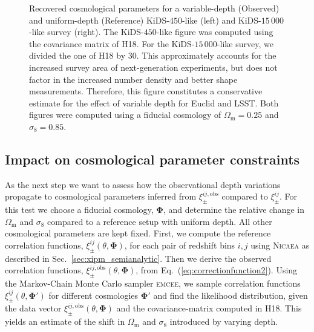 \documentclass{aa}
\renewcommand{\rm}{\mathrm}
\def\b#1{\bm{#1}}
\begin{document}
\begin{figure}
\begin{subfigure}{0.45\textwidth}
\end{subfigure}
\caption{Recovered cosmological parameters for a variable-depth (Observed) and uniform-depth (Reference) KiDS-$450$-like (left) and KiDS-$15\,000$-like survey (right). The KiDS-$450$-like figure was computed using the covariance matrix of H18. For the KiDS-$15\,000$-like survey, we divided the one of H18 by 30. This approximately accounts for the increased survey area of next-generation experiments, but does not factor in the increased number density and better shape measurements. Therefore, this figure constitutes a conservative estimate for the effect of variable depth for Euclid and LSST. Both figures were computed using a fiducial cosmology of $\Omega_{\rm{m}}=0.25$ and $\sigma_8 = 0.85$.}
\label{fig:mcmc_results}
\end{figure} 

\subsection{Impact on cosmological parameter constraints}

As the next step we want to assess how the observational depth variations propagate to cosmological parameters inferred from $\xi_\pm^{ij,\rm{obs}}$ compared to $\xi_\pm^{ij}$. For this test we choose a fiducial cosmology, $\b \Phi$, and determine the relative change in $\Omega_{\rm m}$ and $\sigma_8$ compared to a reference setup with uniform depth. All other cosmological parameters are kept fixed. First, we compute the reference correlation functions, $\xi_\pm^{ij}(\theta,\b\Phi)$, for each pair of redshift bins $i,j$ using \textsc{Nicaea} as described in Sec.~\ref{sec:xipm_semianalytic}. Then we derive the observed correlation functions, $\xi_\pm^{ij,\rm{obs}}(\theta,\b\Phi)$, from Eq.~(\ref{eq:correctionfunction2}). Using the Markov-Chain Monte Carlo sampler \textsc{emcee}, we sample correlation functions $\xi_\pm^{ij}(\theta,\b\Phi')$ for different cosmologies $\b\Phi'$ and find the likelihood distribution, given the data vector $\xi_\pm^{ij,\rm{obs}}(\theta,\b\Phi)$ and the covariance-matrix computed in H18. This yields an estimate of the shift in $\Omega_{\rm m}$ and $\sigma_8$ introduced by varying depth.
\end{document}
